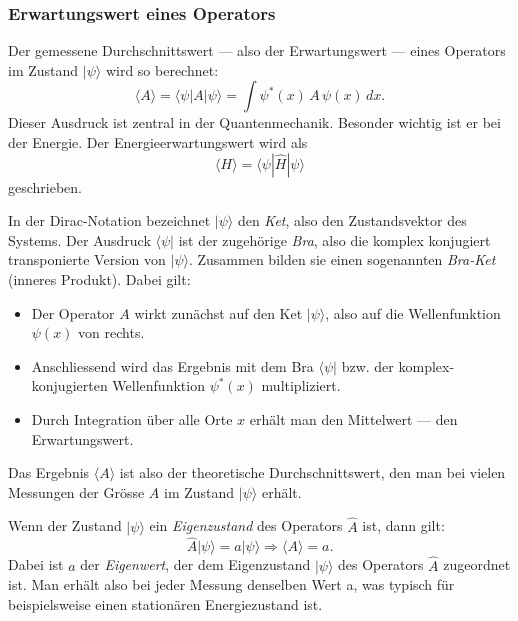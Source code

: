 	\subsubsection{Erwartungswert eines Operators\label{fourier:subsubsection:erwartungswertEinesOperators}}
		Der gemessene Durchschnittswert --- also der Erwartungswert --- eines Operators im Zustand $|\psi\rangle$ wird so berechnet:
		\begin{equation}
			\langle A \rangle = \langle \psi | A | \psi \rangle = \int \psi^*(x)\,A\,\psi(x)\,dx.
		\end{equation}
		Dieser Ausdruck ist zentral in der Quantenmechanik.
		Besonder wichtig ist er bei der Energie. Der Energieerwartungswert wird als
		\begin{equation}
			\langle H \rangle = \langle \psi|\hat{H}|\psi \rangle
		\end{equation}
		geschrieben.

		In der Dirac-Notation bezeichnet $|\psi\rangle$ den \emph{Ket}, also den Zustandsvektor des Systems.
		Der Ausdruck $\langle \psi |$ ist der zugehörige \emph{Bra}, also die komplex konjugiert transponierte Version von $|\psi\rangle$.
		Zusammen bilden sie einen sogenannten \emph{Bra-Ket} (inneres Produkt).
		Dabei gilt:
		\begin{itemize}
			\item Der Operator $A$ wirkt zunächst auf den Ket $|\psi\rangle$, also auf die Wellenfunktion $\psi(x)$ von rechts.
			\item Anschliessend wird das Ergebnis mit dem Bra $\langle \psi|$ bzw. der komplex-konjugierten Wellenfunktion $\psi^*(x)$ multipliziert.
			\item Durch Integration über alle Orte $x$ erhält man den Mittelwert --- den Erwartungswert.
		\end{itemize}
		Das Ergebnis $\langle A \rangle$ ist also der theoretische Durchschnittswert, den man bei vielen Messungen der Grösse $A$ im Zustand $|\psi\rangle$ erhält.

		Wenn der Zustand $|\psi\rangle$ ein \emph{Eigenzustand} des Operators $\hat{A}$ ist, dann gilt:
		\begin{equation}
			\hat{A} | \psi \rangle = a | \psi \rangle \Rightarrow \langle A \rangle = a.
		\end{equation}
		Dabei ist $a$ der \emph{Eigenwert}, der dem Eigenzustand $|\psi\rangle$ des Operators $\hat{A}$ zugeordnet ist. 
		Man erhält also bei jeder Messung denselben Wert a, was typisch für beispielsweise einen stationären Energiezustand ist.

